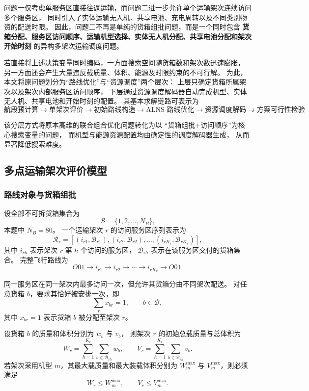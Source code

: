 问题一仅考虑单服务区直接往返运输，而问题二进一步允许单个运输架次连续访问多个服务区，
同时引入了实体运输无人机、共享电池、充电周转以及不同类别物资的配送时限。
因此，问题二不再是单纯的货箱组批问题，而是一个同时包含
\textbf{货箱分配、服务区访问顺序、运输机型选择、实体无人机分配、共享电池分配和架次开始时刻}
的异构多架次运输调度问题。

若直接将上述决策变量同时编码，一方面搜索空间随货箱数和架次数迅速膨胀，
另一方面还会产生大量违反载质量、体积、能源及时限约束的不可行解。
为此，本文将原问题划分为``路线优化''与``资源调度''两个层次：
上层只确定货箱所属架次以及架次内部服务区访问顺序，
下层通过资源调度解码器自动完成机型、实体无人机、共享电池和开始时刻的配置。
其基本求解链路可表示为
\[
\boxed{
	\text{航段预计算}
	\rightarrow
	\text{单架次评价}
	\rightarrow
	\text{初始路线构造}
	\rightarrow
	\text{ALNS 路线优化}
	\rightarrow
	\text{资源调度解码}
	\rightarrow
	\text{方案可行性检验}
}.
\]

该分层方式将原本高维的联合组合优化问题转化为以
``货箱组批+访问顺序''为核心搜索变量的问题，
而机型与能源资源配置均由确定性的调度解码器生成，
从而显著降低搜索难度。

\subsection{多点运输架次评价模型}

\subsubsection{路线对象与货箱组批}

设全部不可拆货箱集合为
\[
\mathcal{B}=\{1,2,\ldots,N_B\},
\]
本题中 $N_B=80$。
一个运输架次 $r$ 的访问服务区序列表示为
\[
\mathcal{R}_r=
\left[
(i_{r1},\mathcal{B}_{r1}),
(i_{r2},\mathcal{B}_{r2}),
\ldots,
(i_{rK_r},\mathcal{B}_{rK_r})
\right],
\]
其中 $i_{rh}$ 表示架次 $r$ 第 $h$ 个访问的服务区，
$\mathcal{B}_{rh}$ 表示在该服务区交付的货箱集合。
完整飞行路线为
\[
O01\rightarrow i_{r1}\rightarrow i_{r2}
\rightarrow\cdots\rightarrow i_{rK_r}\rightarrow O01.
\]

同一服务区在同一架次内最多访问一次，但允许其货箱分由不同架次配送。
对任意货箱 $b$，要求其恰好被安排一次，即
\begin{equation}
	\sum_{r}x_{br}=1,
	\qquad b\in\mathcal{B},
	\label{eq:q2-box-once}
\end{equation}
其中 $x_{br}=1$ 表示货箱 $b$ 被分配至架次 $r$。

设货箱 $b$ 的质量和体积分别为 $w_b$ 与 $v_b$，
则架次 $r$ 的初始总载质量与总体积为
\begin{equation}
	W_r=\sum_{h=1}^{K_r}\sum_{b\in\mathcal{B}_{rh}}w_b,
	\qquad
	V_r=\sum_{h=1}^{K_r}\sum_{b\in\mathcal{B}_{rh}}v_b.
	\label{eq:q2-capacity-total}
\end{equation}
若架次采用机型 $m$，其最大载质量和最大装载体积分别为
$W_m^{\max}$ 与 $V_m^{\max}$，则必须满足
\begin{equation}
	W_r\le W_m^{\max},
	\qquad
	V_r\le V_m^{\max}.
	\label{eq:q2-capacity}
\end{equation}


